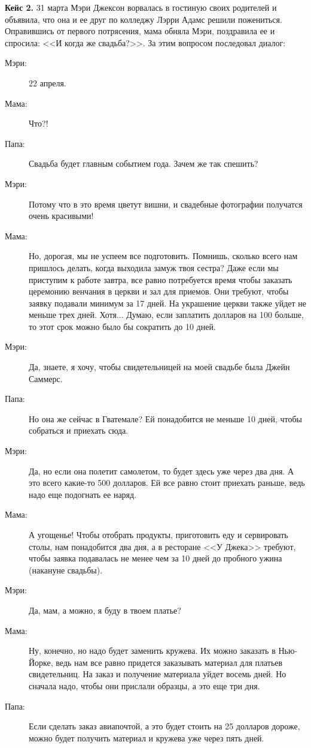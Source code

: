 \documentclass[a4paper,12pt]{extarticle}
\begin{document}
\bigskip
\textbf{Кейс 2.} 
31 марта Мэри Джексон ворвалась в гостиную своих родителей и объявила, что она и ее друг по колледжу Лэрри Адамс решили пожениться. Оправившись от первого потрясения, мама обняла Мэри, поздравила ее и спросила: <<И когда же свадьба?>>. За этим вопросом последовал  диалог:
\begin{description}
\item[Мэри:] 22 апреля.
\item[Мама:] Что?!
\item[Папа:] Свадьба будет главным событием года. Зачем же так спешить?
\item[Мэри:] Потому что в это время цветут вишни, и свадебные фотографии
получатся очень красивыми!
\item[Мама:] Но, дорогая, мы не успеем все подготовить. Помнишь, сколько всего
нам пришлось делать, когда выходила замуж твоя сестра? Даже если мы
приступим к работе завтра, все равно потребуется время чтобы заказать
церемонию венчания в церкви и зал для приемов. Они требуют, чтобы заявку
подавали минимум за 17 дней. На украшение церкви также уйдет не меньше трех
дней. Хотя... Думаю, если заплатить долларов на 100 больше, то этот срок можно
было бы сократить до 10 дней.
\item[Мэри:] Да, знаете, я хочу, чтобы свидетельницей на моей свадьбе была
Джейн Саммерс.
\item[Папа:] Но она же сейчас в Гватемале? Ей понадобится не меньше 10 дней,
чтобы собраться и приехать сюда.
\item[Мэри:] Да, но если она полетит самолетом, то будет здесь уже через два дня.
А это всего какие-то 500 долларов. Ей все равно стоит приехать раньше, ведь надо
еще подогнать ее наряд.
\item[Мама:] А угощенье! Чтобы отобрать продукты, приготовить еду и
сервировать столы, нам понадобится два дня, а в ресторане <<У Джека>> требуют,
чтобы заявка подавалась не менее чем за 10 дней до пробного ужина (накануне
свадьбы).
\item[Мэри:] Да, мам, а можно, я буду в твоем платье?
\item[Мама:] Ну, конечно, но надо будет заменить кружева. Их можно заказать в
Нью-Йорке, ведь нам все равно придется заказывать материал для платьев
свидетельниц. На заказ и получение материала уйдет восемь дней. Но сначала
надо, чтобы они прислали образцы, а это еще три дня.
\item[Папа:] Если сделать заказ авиапочтой, а это будет стоить на 25 долларов
дороже, можно будет получить материал и кружева уже через пять дней.

\end{description}
\end{document}
